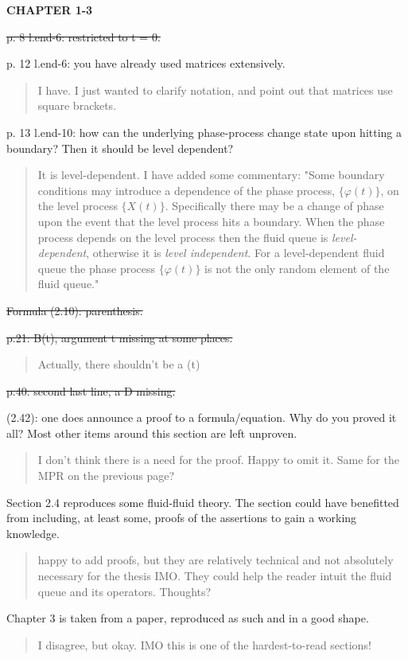 \documentclass[a4paper]{article}
\begin{document}
\noindent\textbf{CHAPTER 1-3}

\st{p. 8 l.end-6: restricted to t = 0.}

p. 12 l.end-6: you have already used matrices extensively.
\begin{quote}
    I have. I just wanted to clarify notation, and point out that matrices use square brackets. 
\end{quote}

p. 13 l.end-10: how can the underlying phase-process change state upon hitting a boundary? Then it should be level dependent?
\begin{quote}
    It is level-dependent. I have added some commentary: "Some boundary conditions may introduce a dependence of the phase process, \(\{\varphi(t)\}\), on the level process \(\{X(t)\}\). Specifically there may be a change of phase upon the event that the level process hits a boundary. When the phase process depends on the level process then the fluid queue is \emph{level-dependent}, otherwise it is \emph{level independent}. For a level-dependent fluid queue the phase process \(\{\varphi(t)\}\) is not the only random element of the fluid queue."
\end{quote}

\st{Formula (2.10): parenthesis.}

\st{p.21: B(t), argument t missing at some places.}
\begin{quote}
    Actually, there shouldn't be a (t)
\end{quote}

\st{p.40: second last line, a D missing.}

(2.42): one does announce a proof to a formula/equation. Why do you proved it all? Most other items around this section are left unproven.
\begin{quote}
    I don't think there is a need for the proof. Happy to omit it. Same for the MPR on the previous page?
\end{quote}

Section 2.4 reproduces some fluid-fluid theory. The section could have benefitted
from including, at least some, proofs of the assertions to gain a working knowledge.
\begin{quote}
    happy to add proofs, but they are relatively technical and not absolutely necessary for the thesis IMO. They could help the reader intuit the fluid queue and its operators. Thoughts?
\end{quote}

Chapter 3 is taken from a paper, reproduced as such and in a good shape.
\begin{quote}
    I disagree, but okay. IMO this is one of the hardest-to-read sections!
\end{quote}
\end{document}
